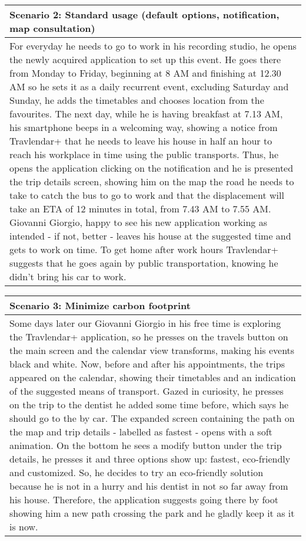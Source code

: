 \pagebreak
%
\begin{center}
\def\arraystretch{1.5}
  \begin{tabular}{ | p{} | }
    \hline
    Scenario 2: Standard usage (default options, notification, map consultation) \\ \hline
    For everyday he needs to go to work in his recording studio, he opens the newly acquired application to set up this event. He goes there from Monday to Friday, beginning at 8 AM and finishing at 12.30 AM so he sets it as a daily recurrent event, excluding Saturday and Sunday, he adds the timetables and chooses location from the favourites. The next day, while he is having breakfast at 7.13 AM, his smartphone beeps in a welcoming way, showing a notice from Travlendar+ that he needs to leave his house in half an hour to reach his workplace in time using the public transports. Thus, he opens the application clicking on the notification and he is presented the trip details screen, showing him on the map the road he needs to take to catch the bus to go to work and that the displacement will take an ETA of 12 minutes in total, from 7.43 AM to 7.55 AM. Giovanni Giorgio, happy to see his new application working as intended - if not, better - leaves his house at the suggested time and gets to work on time. To get home after work hours Travlendar+ suggests that he goes again by public transportation, knowing he didn’t bring his car to work. \\ \hline
  \end{tabular}
\end{center}
%
\begin{center}
\def\arraystretch{1.5}
  \begin{tabular}{ | p{} | }
    \hline
    Scenario 3: Minimize carbon footprint \\ \hline
    Some days later our Giovanni Giorgio in his free time is exploring the Travlendar+ application, so he presses on the travels button on the main screen and the calendar view transforms, making his events black and white. Now, before and after his appointments, the trips appeared on the calendar, showing their timetables and an indication of the suggested means of transport. Gazed in curiosity, he presses on the trip to the dentist he added some time before, which says he should go to the by car. The expanded screen containing the path on the map and trip details - labelled as fastest - opens with a soft animation. On the bottom he sees a modify button under the trip details, he presses it and three options show up: fastest, eco-friendly and customized. So, he decides to try an eco-friendly solution because he is not in a hurry and his dentist in not so far away from his house. Therefore, the application suggests going there by foot showing him a new path crossing the park and he gladly keep it as it is now. \\ \hline
  \end{tabular}
\end{center}
